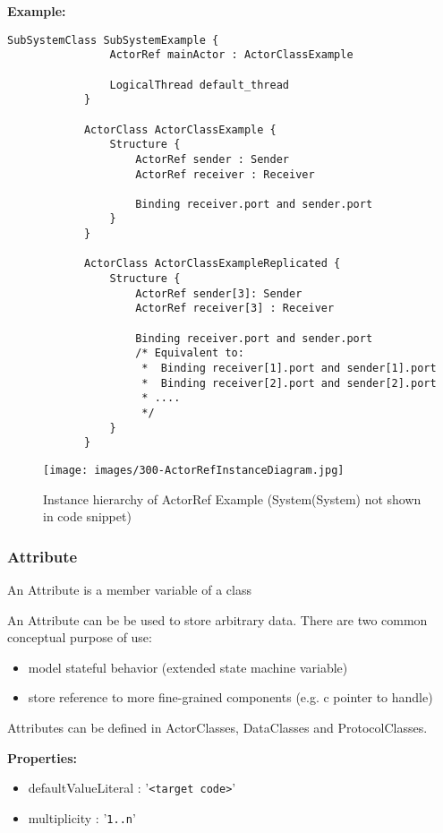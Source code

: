 		\textbf{Example:}
		
			\begin{lstlisting}[language=ROOM]
			SubSystemClass SubSystemExample {
				ActorRef mainActor : ActorClassExample
				
				LogicalThread default_thread
			}
			
			ActorClass ActorClassExample {
				Structure {
					ActorRef sender : Sender
					ActorRef receiver : Receiver
					
					Binding receiver.port and sender.port
				}
			}
			
			ActorClass ActorClassExampleReplicated {
				Structure {
					ActorRef sender[3]: Sender
					ActorRef receiver[3] : Receiver
					
					Binding receiver.port and sender.port
					/* Equivalent to:
					 *  Binding receiver[1].port and sender[1].port
					 *  Binding receiver[2].port and sender[2].port
					 * ....
					 */		
				}
			}
			\end{lstlisting}
			\begin{figure}[H]
			\texttt{[image: images/300-ActorRefInstanceDiagram.jpg]}
			\caption*{Instance hierarchy of ActorRef Example (\textsf{System(System)} not shown in code snippet)}
			\end{figure}
	
	\vspace{\baselineskip}
	\vspace{\baselineskip}
	\vspace{\baselineskip}
	
	\subsubsection{Attribute}
		\hypertarget{ref:Attribute}{}
		
		An Attribute is a member variable of a class
		
		An Attribute can be be used to store arbitrary data. There are two common conceptual purpose of use:
		\begin{itemize}
			\item model stateful behavior (extended state machine variable)
			\item store reference to more fine-grained components (e.g. c pointer to handle)
		\end{itemize}
		Attributes can be defined in ActorClasses, DataClasses and ProtocolClasses.
		
		\textbf{Properties:}
		\begin{itemize}
		\item defaultValueLiteral : '\verb|<target code>|'
		\item multiplicity : '\verb|1..n|'
		\end{itemize}
		
